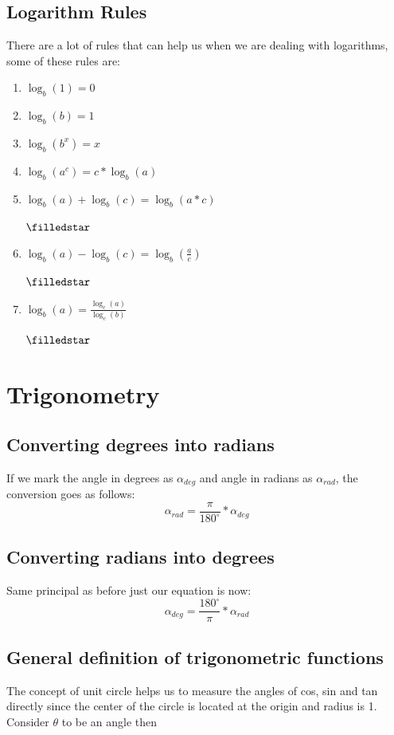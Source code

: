 \documentclass[a4paper, 15pt]{article}
\newcommand{\importantStar}{
	\begin{Large}
		\textcolor{red}{$\filledstar$}
	\end{Large}
}
\begin{document}
		\subsection{Logarithm Rules}
			\noindent There are a lot of rules that can help us when we are dealing with logarithms, some of these rules are:
			\begin{enumerate}
				\item $\log_{b}(1) = 0$
				\item $\log_{b}(b) = 1$
				\item $\log_{b}(b^x) = x$
				\item $\log_{b}(a^c) = c*\log_{b}(a)$
				\item $\log_{b}(a) + \log_{b}(c) = \log_{b}(a*c)$ \hspace{4mm} \importantStar
				\item $\log_{b}(a) - \log_{b}(c) = \log_{b}(\frac{a}{c})$ \hspace{4mm} \importantStar
				\item $\log_{b}(a) = \frac{\log_{c}(a)}{\log_{c}(b)}$ \hspace{4mm} \importantStar
			\end{enumerate}
		\pagebreak
		
	\section{Trigonometry}
		\subsection{Converting degrees into radians}
			\noindent If we mark the angle in degrees as \emph{$\alpha_{deg}$} and angle in radians as \emph{$\alpha_{rad}$}, the conversion goes as follows:
			\begin{equation*}
				\alpha_{rad} = \frac{\pi}{180^{\circ}} * \alpha_{deg}
			\end{equation*}
		
		\subsection{Converting radians into degrees}
			\noindent Same principal as before just our equation is now:
			\begin{equation*}
				\alpha_{deg} = \frac{180^{\circ}}{\pi} * \alpha_{rad}
			\end{equation*}
		
		\subsection{General definition of trigonometric functions}
			\noindent The concept of unit circle helps us to measure the angles of cos, sin and tan directly since the center of the circle is located at the origin and radius is 1. Consider $\theta$  to be an angle then
			
\end{document}
